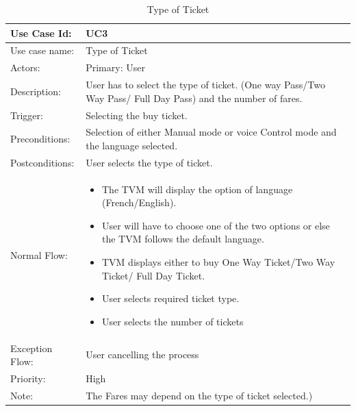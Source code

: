 \documentclass[11pt,oneside]{book}
\begin{document}
\begin{table}[h]
\centering
\begin{tabular}{|p{2.4cm}|p{11cm}|}
\hline
{Use Case Id: } & {UC3} \\
\hline
{Use case name:} & {Type of Ticket}\\
\hline
{Actors: } & {Primary: User}\\
\hline
{Description:} & {User has to select the type of ticket. (One way Pass/Two Way Pass/ Full Day Pass) and the number of fares.  }\\
\hline
 
{Trigger:  } & {Selecting the buy ticket.}\\
\hline
{Preconditions:  } & {Selection of either Manual mode or voice Control mode and the language selected.}\\
\hline
{Postconditions:} & {User selects the type of ticket.}\\
\hline
{Normal Flow: } & {
\begin{itemize}
\item	The TVM will display the option of language (French/English).
\item	User will have to choose one of the two options or else the TVM follows the default language.
\item	TVM displays either to buy One Way Ticket/Two Way Ticket/ Full Day Ticket.
\item	User selects required ticket type.
\item	User selects the number of tickets

\end{itemize}
}\\
\hline
{Exception Flow: } & {User cancelling the process}\\
\hline
{Priority:  } & {High}\\
\hline
{Note:  } & {The Fares may depend on the type of ticket selected.)}\\
\hline
\end{tabular}
\caption{Type of Ticket}
\end{table}
\end{document}
